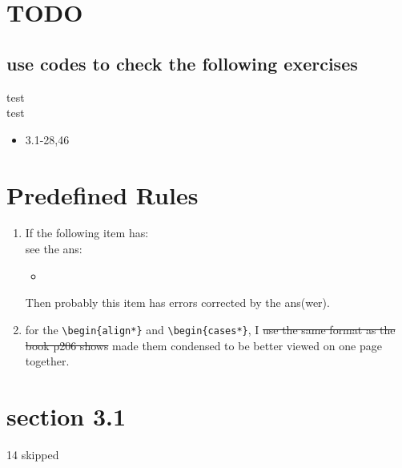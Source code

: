 \documentclass{article}
\edef\mylb{\\}
\newcommand{\CondensedNewline}{\mylb[-0.5em]}
\newcommand{\ecc}[1]{%
    see the ans:%
    \begin{itemize}[noitemsep]%
        #1%
    \end{itemize}
}
\begin{document}
\setlength{\parindent}{20pt}
\section{TODO}
\subsection{use codes to check the following exercises}
test \\
test
\begin{itemize}
    \item 3.1-28,46
\end{itemize}
\section{Predefined Rules}
\begin{enumerate}
    \item If the following item has: \\
          \ecc{\item }
          Then probably this item has errors corrected by the ans(wer).

    \item for the \verb|\begin{align*}| and \verb|\begin{cases*}|, I \sout{use the same format as the book p206 shows} made them condensed to be better viewed on one page together.
\end{enumerate}
\section{section 3.1}


\setlength{\textfloatsep}{0pt}%
\setlength{\intextsep}{4pt}%
\begin{large}
    14 skipped
\end{large}
\end{document}
